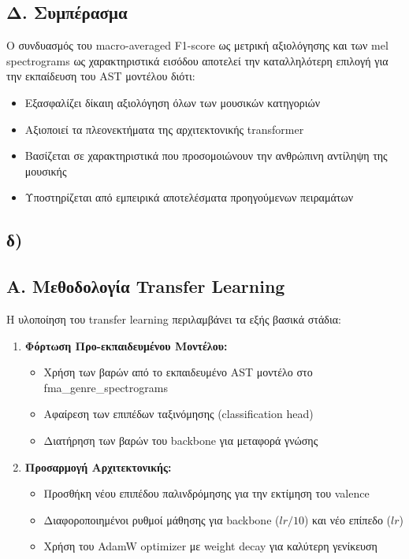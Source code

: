 \documentclass[a4paper,12pt]{article}
\begin{document}
\subsection*{Δ. Συμπέρασμα}

Ο συνδυασμός του macro-averaged F1-score ως μετρική αξιολόγησης και των mel spectrograms ως χαρακτηριστικά εισόδου αποτελεί την καταλληλότερη επιλογή για την εκπαίδευση του AST μοντέλου διότι:

\begin{itemize}
    \item Εξασφαλίζει δίκαιη αξιολόγηση όλων των μουσικών κατηγοριών
    \item Αξιοποιεί τα πλεονεκτήματα της αρχιτεκτονικής transformer
    \item Βασίζεται σε χαρακτηριστικά που προσομοιώνουν την ανθρώπινη αντίληψη της μουσικής
    \item Υποστηρίζεται από εμπειρικά αποτελέσματα προηγούμενων πειραμάτων
\end{itemize}

\subsection*{δ)}

\subsection*{Α. Μεθοδολογία Transfer Learning}

Η υλοποίηση του transfer learning περιλαμβάνει τα εξής βασικά στάδια:

\begin{enumerate}
    \item \textbf{Φόρτωση Προ-εκπαιδευμένου Μοντέλου:}
    \begin{itemize}
        \item Χρήση των βαρών από το εκπαιδευμένο AST μοντέλο στο fma\_genre\_spectrograms
        \item Αφαίρεση των επιπέδων ταξινόμησης (classification head)
        \item Διατήρηση των βαρών του backbone για μεταφορά γνώσης
    \end{itemize}
    
    \item \textbf{Προσαρμογή Αρχιτεκτονικής:}
    \begin{itemize}
        \item Προσθήκη νέου επιπέδου παλινδρόμησης για την εκτίμηση του valence
        \item Διαφοροποιημένοι ρυθμοί μάθησης για backbone ($lr/10$) και νέο επίπεδο ($lr$)
        \item Χρήση του AdamW optimizer με weight decay για καλύτερη γενίκευση
    \end{itemize}
\end{enumerate}
\end{document}
